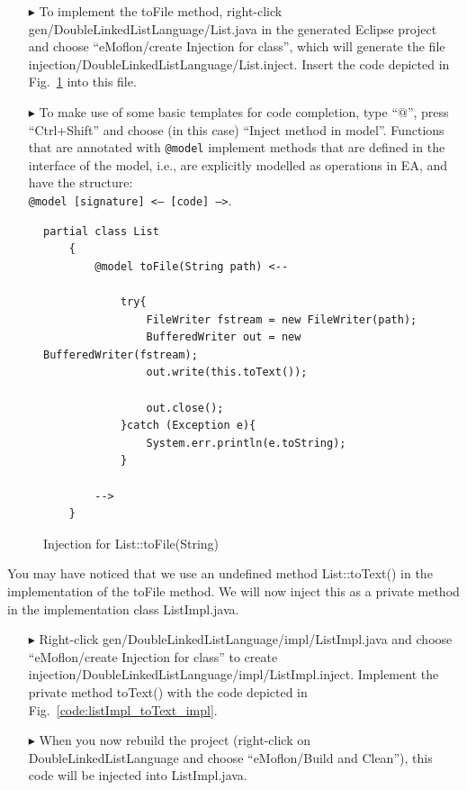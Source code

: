 \begin{enumerate}
  \item[$\blacktriangleright$] To implement the \textsf{toFile} method, right-click \textsf{gen/Double\-Linked\-List\-Language/\-List.java} in the generated Eclipse project and choose ``eMoflon/create Injection for class'', which will generate the file \textsf{injection/DoubleLinkedListLanguage/List.inject}.
	Insert the code depicted in Fig.~\ref{code:list_toFile_impl} into this file.
  \item[$\blacktriangleright$] To make use of some basic templates for code completion, type ``$@$'', press ``Ctrl+Shift'' and choose (in this case) ``Inject method in model''. 
  Functions that are annotated with \texttt{@model} implement methods that are defined in the interface of the model, i.e., are explicitly modelled as operations in EA, and have the structure:\\ 
  \texttt{@model [signature] <-- [code] -->}.
\end{enumerate}
\begin{figure}[htbp]
\centering
	\begin{lstlisting}[language=Injection]
	partial class List
	{
    	@model toFile(String path) <--

        	try{
            	FileWriter fstream = new FileWriter(path);
            	BufferedWriter out = new BufferedWriter(fstream);
            	out.write(this.toText());

            	out.close();
        	}catch (Exception e){
            	System.err.println(e.toString);
        	}

    	-->
	}
\end{lstlisting}
\caption{Injection for \textsf{List::toFile(String)}}
\label{code:list_toFile_impl}
\end{figure}

You may have noticed that we use an undefined method \textsf{List::toText()} in the implementation of the \textsf{toFile} method. 
We will now inject this as a private method in the implementation class \textsf{ListImpl.java}.

\begin{enumerate}
  \item[$\blacktriangleright$] Right-click \textsf{gen/DoubleLinkedListLanguage/impl/ListImpl.java} and choose ``eMoflon/create Injection for class'' to create \textsf{injection/DoubleLinkedListLanguage/impl/ListImpl.inject}.
  Implement the private method \textsf{toText()} with the code depicted in Fig.~\ref{code:listImpl_toText_impl}.  
  \item[$\blacktriangleright$] When you now rebuild the project (right-click on \textsf{DoubleLinkedListLanguage} and choose ``eMoflon/Build and Clean''), this code will be injected into \textsf{ListImpl.java}. 
\end{enumerate}
 
